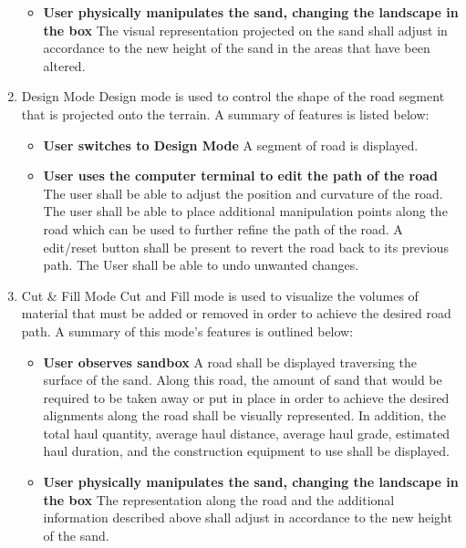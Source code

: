 \begin{enumerate}
\begin{itemize}
\item \textbf{User physically manipulates the sand, changing the landscape in the box}
The visual representation projected on the sand shall adjust in accordance to the new height of the sand in the areas that have been altered. 

\end{itemize}

\item{Design Mode}
Design mode is used to control the shape of the road segment that is projected onto the terrain. A summary of features is listed below:

\begin{itemize}
\item \textbf{User switches to Design Mode}
A segment of road is displayed.

\item \textbf{User uses the computer terminal to edit the path of the road}
The user shall be able to adjust the position and curvature of the road.
The user shall be able to place additional manipulation points along the road which can be used to further refine the path of the road.
A edit/reset button shall be present to revert the road back to its previous path.
The User shall be able to undo unwanted changes.

\end{itemize}

\item{Cut \& Fill Mode}
Cut and Fill mode is used to visualize the volumes of material that must be added or removed in order to achieve the desired road path. A summary of this mode's features is outlined below:

\begin{itemize}
\item \textbf{User observes sandbox}
A road shall be displayed traversing the surface of the sand.  Along this road, the amount of sand that would be required to be taken away or put in place in order to achieve the desired alignments along the road shall be visually represented.  In addition, the total haul quantity, average haul distance, average haul grade, estimated haul duration, and the construction equipment to use shall be displayed.

\item \textbf{User physically manipulates the sand, changing the landscape in the box}
The representation along the road and the additional information described above shall adjust in accordance to the new height of the sand.
\end{itemize}
\end{enumerate}
